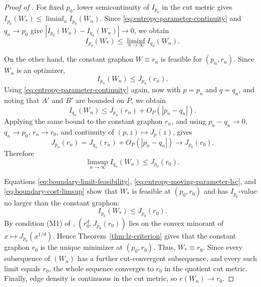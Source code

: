 \begin{proof}[Proof of ]
For fixed $p_0$, lower semicontinuity of $I_{p_0}$ in the cut metric gives
$I_{p_0}(W_*)\le\liminf_n I_{p_0}(W_n)$.  Since
\eqref{eq:entropy-parameter-continuity} and $q_n\to p_0$ give
$|I_{p_0}(W_n)-I_{q_n}(W_n)|\to0$, we obtain
\begin{equation}\label{eq:entropy-moving-parameter-lsc}
  I_{p_0}(W_*)
  \le
  \liminf_{n\to\infty} I_{q_n}(W_n).
\end{equation}

On the other hand, the constant graphon $W\equiv r_n$ is feasible for
$(p_n,r_n)$.  Since $W_n$ is an optimizer,
\[
  I_{p_n}(W_n)\le J_{p_n}(r_n).
\]
Using \eqref{eq:entropy-parameter-continuity} again, now with $p=p_n$ and $q=q_n$,
and noting that $A'$ and $B'$ are bounded on $P$, we obtain
\[
  I_{q_n}(W_n)
  \le
  J_{p_n}(r_n)+O_P(|p_n-q_n|).
\]
Applying the same bound to the constant graphon $r_n$, and using
$p_n-q_n\to0$, $q_n\to p_0$, $r_n\to r_0$, and continuity of
$(p,z)\mapsto J_p(z)$, gives
\[
  J_{p_n}(r_n)=J_{q_n}(r_n)+O_P(|p_n-q_n|)\to J_{p_0}(r_0).
\]
Therefore
\begin{equation}\label{eq:boundary-cost-limsup}
  \limsup_{n\to\infty} I_{q_n}(W_n)
  \le
  J_{p_0}(r_0).
\end{equation}

Equations \eqref{eq:boundary-limit-feasibility}, \eqref{eq:entropy-moving-parameter-lsc}, and \eqref{eq:boundary-cost-limsup} show
that $W_*$ is feasible at $(p_0,r_0)$ and has $I_{p_0}$-value no larger than the
constant graphon:
\[
  I_{p_0}(W_*)\le J_{p_0}(r_0).
\]
By condition (M1) of ,
$(r_0^d,J_{p_0}(r_0))$ lies on the convex minorant of
$x\mapsto J_{p_0}(x^{1/d})$.  Hence
Theorem~\ref{thm:lz-criterion} gives that the constant graphon $r_0$
is the unique minimizer at $(p_0,r_0)$.  Thus,  $W_*\equiv r_0$.  Since every subsequence of $(W_n)$ has a further
cut-convergent subsequence, and every such limit equals $r_0$, the whole
sequence converges to $r_0$ in the quotient cut metric.  Finally, edge
density is continuous in the cut metric, so $e(W_n)\to r_0$.
\end{proof}

